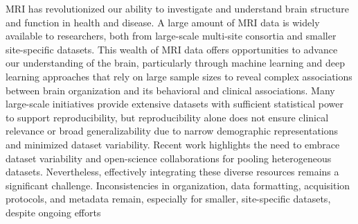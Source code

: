 MRI has revolutionized our ability to investigate and understand brain structure and function in health and disease. 
A large amount of MRI data is widely available to researchers, 
both from large-scale multi-site consortia and smaller site-specific datasets. 
This wealth of MRI data offers opportunities to advance our understanding of the brain, 
particularly through machine learning and deep learning approaches that rely on large sample sizes to reveal complex associations 
between brain organization and its behavioral and clinical associations. 
Many large-scale initiatives provide extensive datasets with sufficient statistical power to support reproducibility, 
but reproducibility alone does not ensure clinical relevance or broad generalizability 
due to narrow demographic representations and minimized dataset variability. 
Recent work highlights the need to embrace dataset variability and open-science collaborations for pooling heterogeneous datasets. 
Nevertheless, effectively integrating these diverse resources remains a significant challenge. 
Inconsistencies in organization, data formatting, acquisition protocols, 
and metadata remain, especially for smaller, site-specific datasets, despite ongoing efforts 
